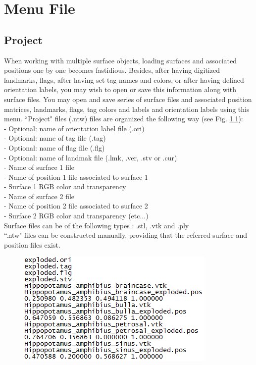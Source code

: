 \chapter{Menu File}
\minitoc  


\section{Project}
When working with multiple surface objects, loading surfaces and associated positions one by one becomes fastidious. Besides, after having digitized landmarks, flags, after having set tag names and colors, or after having defined orientation labels, you may wish to open or save this information along with surface files. You may open and save series of surface files and associated position matrices, landmarks, flags, tag colors and labels and orientation labels using this menu. ``Project" files (.ntw) files are organized the following way (see Fig. \ref{project_file}):\\
- Optional: name of orientation label file (.ori)\\
- Optional: name of tag file (.tag)\\
- Optional: name of flag file (.flg)\\
- Optional: name of landmak file (.lmk, .ver, .stv or .cur)\\
- Name of surface 1 file\\
- Name of position 1 file associated to surface 1\\
- Surface 1 RGB color and transparency\\
- Name of surface 2 file\\
- Name of position 2 file associated to surface 2\\
- Surface 2 RGB color and transparency (etc...)\\
 
Surface files can be of the following types : .stl, .vtk and .ply\\
``.ntw" files can be constructed manually, providing that the referred surface and position files exist.



\begin{figure}
  \centering  
 \includegraphics[scale=0.5]{images/07/project/ntw.png}
\label{project_file}
\end{figure}

